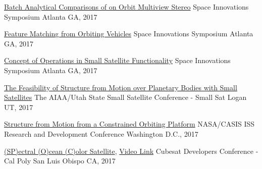 \documentclass[10pt,a4paper]{article}
\begin{document}
\headedsection
  {{\color{bluegreen} \faTelevision} \href{http://smallsat.uga.edu/images/documents/presentations/Adams,Caleb_Presentation.pdf}{Batch Analytical Comparisons of on Orbit Multiview Stereo}}{%
  \headedsubsection
    {Space Innovations Symposium}
    {Atlanta GA, 2017}
    {}
}

\headedsection
  {{\color{bluegreen} \faMapO} \href{http://smallsat.uga.edu/images/documents/posters/Feature_Matching_from_Orbiting_Vehicles.pdf}{Feature Matching from Orbiting Vehicles}}{%
  \headedsubsection
    {Space Innovations Symposium}
    {Atlanta GA, 2017}
    {}
}

\headedsection
  {{\color{bluegreen} \faMapO} \href{http://smallsat.uga.edu/images/documents/posters/Symposium_for_Space_Innovations_Poster.pdf}{Concept of Operations in Small Satellite Functionality}}{%
  \headedsubsection
    {Space Innovations Symposium}
    {Atlanta GA, 2017}
    {}
}

\headedsection
  {{\color{bluegreen} \faTelevision} \href{http://smallsat.uga.edu/images/documents/presentations/Feasability_of_Structure_from_motion_over_planetary_bodies_using_small_satellites.pdf}{The Feasibility of Structure from Motion over Planetary Bodies with Small Satellites}}{%
  \headedsubsection
    {The AIAA/Utah State Small Satellite Conference - Small Sat}
    {Logan UT, 2017}
    {}
}

\headedsection
  {{\color{bluegreen} \faMapO} \href{http://smallsat.uga.edu/images/documents/posters/Structure_from_Motion_from_a_Constrained_Orbit.pdf}{Structure from Motion from a Constrained Orbiting Platform}}{%
  \headedsubsection
    {NASA/CASIS ISS Research and Development Conference}
    {Washington D.C., 2017}
    {}
}

\headedsection
  {{\color{bluegreen} \faTelevision} \href{http://smallsat.uga.edu/images/documents/presentations/UGAWorkshop2017CubeSatDeveloper.pdf}{(SP)ectral (O)cean (C)olor Satellite}, \href{https://youtu.be/QDb6PAgxWv0?t=9846}{ {\color{bluegreen} \faYoutubePlay} Video Link}}{%
  \headedsubsection
    {Cubesat Developers Conference - Cal Poly}
    {San Luis Obispo CA, 2017}
    {}
}
\end{document}
